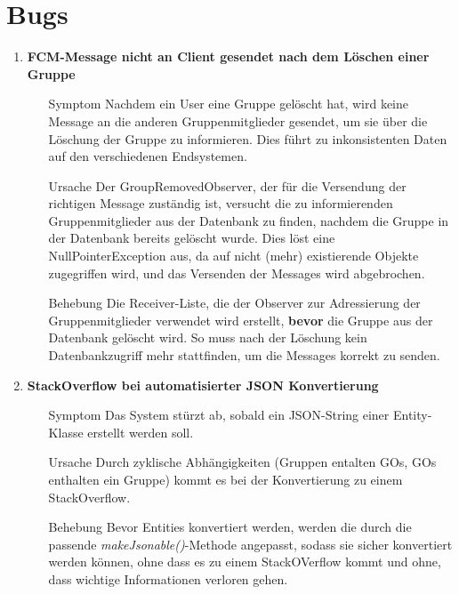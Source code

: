 \documentclass[11pt,a4paper]{scrartcl}
\def\threedigits#1{%
  \ifnum#1<100 0\fi
  \ifnum#1<10 0\fi
  \number#1}
\begin{document}
\newpage

\section{Bugs}

\begin{enumerate}[label={\textbf{/B\protect\threedigits{\theenumi}0/}}, leftmargin=*]
\item \textbf{FCM-Message nicht an Client gesendet nach dem Löschen einer Gruppe}
	\begin{itemize}
		\item[Symptom]
		Nachdem ein User eine Gruppe gelöscht hat, wird keine Message an die anderen Gruppenmitglieder gesendet, um sie über die Löschung der Gruppe zu informieren. Dies führt zu inkonsistenten Daten auf den verschiedenen Endsystemen.
		\item[Ursache]
		Der GroupRemovedObserver, der für die Versendung der richtigen Message zuständig ist, versucht die zu informierenden Gruppenmitglieder aus der Datenbank zu finden, nachdem die Gruppe in der Datenbank bereits gelöscht wurde. Dies löst eine NullPointerException aus, da auf nicht (mehr) existierende Objekte zugegriffen wird, und das Versenden der Messages wird abgebrochen.
		\item[Behebung]
		Die Receiver-Liste, die der Observer zur Adressierung der Gruppenmitglieder verwendet wird erstellt, \textbf{bevor} die Gruppe aus der Datenbank gelöscht wird. So muss nach der Löschung kein Datenbankzugriff mehr stattfinden, um die Messages korrekt zu senden.
	\end{itemize}

\item \textbf{StackOverflow bei automatisierter JSON Konvertierung}
	\begin{itemize}
		\item[Symptom]
		Das System stürzt ab, sobald ein JSON-String einer Entity-Klasse erstellt werden soll.
		\item[Ursache]
		Durch zyklische Abhängigkeiten (Gruppen entalten GOs, GOs enthalten ein Gruppe) kommt es bei der Konvertierung zu einem StackOverflow.
		\item[Behebung]
		Bevor Entities konvertiert werden, werden die durch die passende \textit{makeJsonable()}-Methode angepasst, sodass sie sicher konvertiert werden können, ohne dass es zu einem StackOVerflow kommt und ohne, dass wichtige Informationen verloren gehen.
	\end{itemize}


\end{enumerate}
\end{document}
